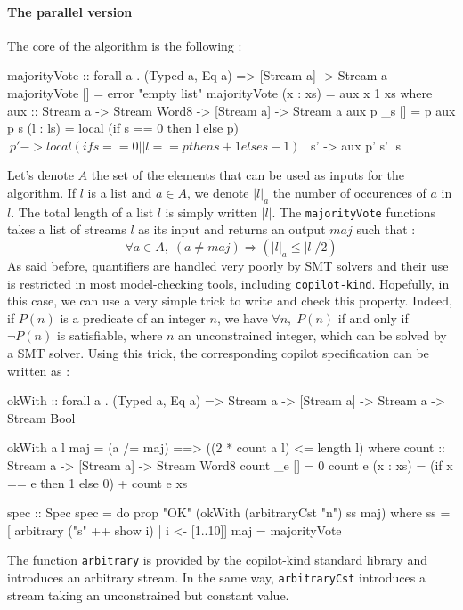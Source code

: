 \paragraph{The parallel version}

The core of the algorithm is the following :

\begin{code}
majorityVote :: forall a . (Typed a, Eq a) => [Stream a] -> Stream a
majorityVote [] = error "empty list"
majorityVote (x : xs) = aux x 1 xs
  where
  aux :: Stream a -> Stream Word8 -> [Stream a] -> Stream a
  aux p _s [] = p
  aux p s (l : ls) =
    local (if s == 0 then l else p) $ \ p' ->
    local (if s == 0 || l == p then s + 1 else s - 1) $ \ s' ->
    aux p' s' ls
\end{code}
Let's denote $A$ the set of the elements that can be used as inputs for the algorithm. If $l$ is a list and $a \in A$, we denote $|l|_a$ the number of occurences of $a$ in $l$. The total length of a list $l$ is simply written $|l|$. The \texttt{majorityVote} functions takes a list of streams $l$ as its input and returns an output $maj$ such that : \[ \forall a \in A, \;  \left( a \neq maj \right) \Longrightarrow \left(|l|_a \leq |l| / {2}\right)  \] As said before, quantifiers are handled very poorly by SMT solvers and their use is restricted in most model-checking tools, including \texttt{copilot-kind}. Hopefully, in this case, we can use a very simple trick to write and check this property. Indeed, if $P(n)$ is a predicate of an integer $n$, we have $\forall n, \; P(n)$ if and only if $\neg P(n)$ is satisfiable, where $n$ an unconstrained integer, which can be solved by a SMT solver. Using this trick, the corresponding copilot specification can be written as :
\begin{code}
okWith :: 
  forall a . (Typed a, Eq a) => 
  Stream a -> [Stream a] -> Stream a -> Stream Bool
  
okWith a l maj = (a /= maj) ==> ((2 * count a l) <= length l)
  where
  count :: Stream a -> [Stream a] -> Stream Word8
  count _e [] = 0
  count e (x : xs) = (if x == e then 1 else 0) + count e xs

spec :: Spec
spec = do
  prop "OK" (okWith (arbitraryCst "n") ss maj)
  where
    ss = [ arbitrary ("s" ++ show i) | i <- [1..10]]
    maj = majorityVote
\end{code}
The function \texttt{arbitrary} is provided by the copilot-kind standard library and introduces an arbitrary stream. In the same way, \texttt{arbitraryCst} introduces a stream taking an unconstrained but constant value.

